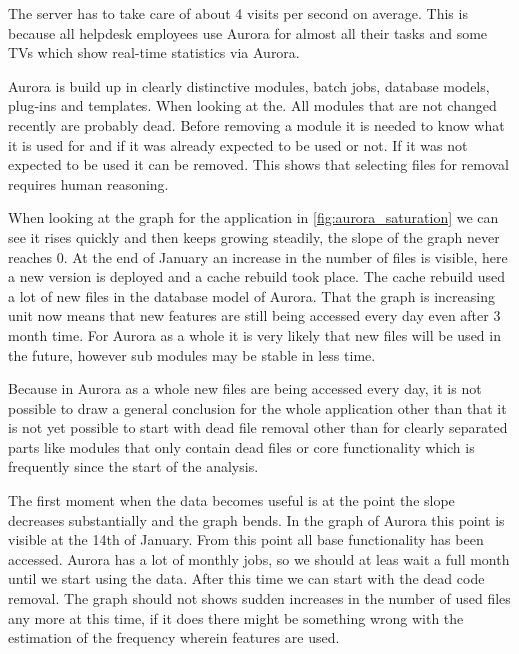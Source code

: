 The server has to take care of about 4 visits per second on average. This is because all helpdesk employees use Aurora for almost all their tasks and some TVs which show real-time statistics via Aurora.

Aurora is build up in clearly distinctive modules, batch jobs, database models, plug-ins and templates.
When looking at the. All modules that are not changed recently are probably dead. Before removing a module it is needed to know what it is used for and if it was already expected to be used or not. If it was not expected to be used it can be removed. This shows that selecting files for removal requires human reasoning.


When looking at the graph for the application in \autoref{fig:aurora_saturation} we can see it rises quickly and then keeps growing steadily, the slope of the graph never reaches 0. At the end of January an increase in the number of files is visible, here a new version is deployed and a cache rebuild took place. The cache rebuild used a lot of new files in the database model of Aurora. That the graph is increasing unit now means that new features are still being accessed every day even after 3 month time. For Aurora as a whole it is very likely that new files will be used in the future, however sub modules may be stable in less time. 

Because in Aurora as a whole new files are being accessed every day, it is not possible to draw a general conclusion for the whole application other than that it is not yet possible to start with dead file removal other than for clearly separated parts like modules that only contain dead files or core functionality which is frequently since the start of the analysis.

The first moment when the data becomes useful is at the point the slope decreases substantially and the graph bends. In the graph of Aurora this point is visible at the 14th of January. From this point all base functionality has been accessed. Aurora has a lot of monthly jobs, so we should at leas wait a full month until we start using the data. After this time we can start with the dead code removal. The graph should not shows sudden increases in the number of used files any more at this time, if it does there might be something wrong with the estimation of the frequency wherein features are used.

